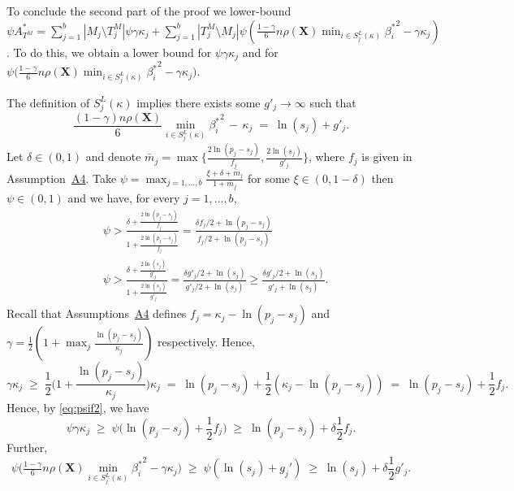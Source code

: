 \documentclass[
  12pt]{article}
\newcommand{\bX}{\mathbf{X}}
\begin{document}
To conclude the second part of the proof we lower-bound $\psi A^*_{T^M}=\sum_{j=1}^b|M_j \setminus T^M_j|\psi\gamma\kappa_j + \sum_{j=1}^b |T^M_j \setminus M_j|\psi\left(\tfrac{1-\gamma}{6} n \rho(\bX) \min_{i\in S^{L}_j(\kappa)}{\beta^*_i}^{2} - \gamma\kappa_j\right)$. To do this, we obtain a lower bound for $\psi \gamma \kappa_j$ and for $\psi\bigg(\tfrac{1-\gamma}{6} n \rho(\bX) \min_{i\in S^{L}_j(\kappa)}{\beta^*_i}^{2} - \gamma\kappa_j\bigg)$.


The definition of $S^{L}_j(\kappa)$ implies there exists some $g'_j \to \infty$ such that
\begin{equation}\label{eq:bngrws}
  \frac{(1-\gamma) n\rho(\bX)}{6}\min_{i\in S^{L}_j(\kappa)}{\beta^*_i}^{2}\,- \,\kappa_j \;=\; \ln(s_j) + g'_{j}.  
\end{equation}
Let $\delta \in (0,1)$ and denote $\bar{m}_j=\max\big\{\frac{2\ln(p_j-s_j)}{f_j},\frac{2\ln(s_j)}{g'_{j}}\big\}$, where $f_j$ is given in Assumption~\hyperlink{lab:A4}{A4}. 
Take $\psi=\max_{j=1,\ldots,b}\frac{\xi + \delta + \bar{m}_j}{1+\bar{m}_j}$ for some $\xi \in(0, 1- \delta)$ then $\psi \in (0,1)$ and we have, for every $j=1,\ldots,b$,
\begin{align}
    &\psi > \frac{\delta + \frac{2\ln(p_j-s_j)}{f_j}}{1+\frac{2\ln(p_j-s_j)}{f_j}} = \frac{\delta f_j/2 + \ln(p_j-s_j)}{f_j/2 +\ln(p_j-s_j)} \label{eq:psif2}\\
    &\psi > \frac{\delta + \frac{2\ln(s_j)}{g'_j}}{1+\frac{2\ln(s_j)}{g'_j}} = \frac{\delta g'_j/2 + \ln(s_j)}{g'_j/2 +\ln(s_j)} \geq \frac{\delta g'_j/2 + \ln(s_j)}{g'_j +\ln(s_j)}.\label{eq:psig2}
\end{align}
 Recall that Assumptions~\hyperlink{lab:A4}{A4} defines $f_j= \kappa_j - \ln(p_j-s_j)$ and $\gamma= \frac{1}{2}(1 + \max_j \frac{\ln(p_j-s_j)}{\kappa_j})$ respectively. Hence,
$$
\gamma\kappa_j\;\geq\;\frac12 \Big(1+\frac{\ln(p_j-s_j)}{\kappa_j}\Big)\kappa_j\;=\;\ln(p_j-s_j)+\frac12(\kappa_j-\ln(p_j-s_j)) \;=\; \ln(p_j-s_j)+ \frac12f_j.
$$
Hence, by \eqref{eq:psif2}, we have
\begin{equation}\label{eq:ooofjfj3}
\psi\gamma\kappa_j \;\geq\; \psi\big(\ln(p_j-s_j)+ \frac12f_j\big) \;\geq\;  \ln(p_j-s_j)+ \delta\frac12f_j.
\end{equation}
Further,
\begin{equation}\label{eq:ooofjfj4}
\psi\bigg(\tfrac{1-\gamma}{6} n \rho(\bX) \min_{i\in S^{L}_j(\kappa)}{\beta^*_i}^{2} - \gamma\kappa_j\bigg) \;\geq\; \psi\left(\ln(s_j)+g_j'\right) \;\geq\; \ln(s_j)+\delta \frac{1}{2}g'_j.
\end{equation}
\end{document}
